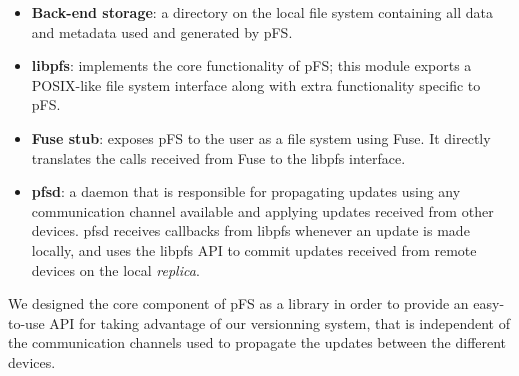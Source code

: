 \begin {itemize}
\item \textbf{Back-end storage}: a directory on the local file system
  containing all data and metadata used and generated by pFS.
\item \textbf{libpfs}: implements the core functionality of pFS; this
  module exports a POSIX-like file
  system interface along with extra functionality specific to pFS.
\item \textbf{Fuse stub}: exposes pFS to the user as a file system
  using Fuse. It directly translates the calls received from Fuse to
  the libpfs interface.
\item \textbf{pfsd}: a daemon that is responsible for propagating
  updates using any communication channel available and applying
  updates received from other devices. pfsd receives callbacks
  from libpfs whenever an update is made locally, and uses the libpfs API
  to commit updates received from remote devices on the local
  \emph{replica}.
\end {itemize}

We designed the core component of pFS as a library in order to provide
an easy-to-use API for taking advantage of our versionning system,
that is independent of the communication channels used to propagate
the updates between the different devices. 




